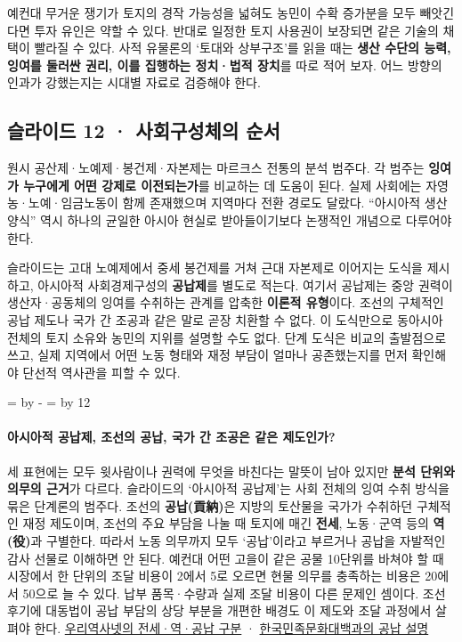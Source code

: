 \documentclass[10pt,a4paper]{article}
\newcommand{\ReserveQuestionSpace}{%
  \par\begingroup
  \dimen0=\pagegoal \advance\dimen0 by -\pagetotal
  \dimen2=\baselineskip \multiply\dimen2 by 12
  \ifdim\dimen0<\dimen2 \newpage\fi
  \endgroup}
\begin{document}
예컨대 무거운 쟁기가 토지의 경작 가능성을 넓혀도 농민이 수확 증가분을 모두 빼앗긴다면 투자 유인은 약할 수 있다. 반대로 일정한 토지 사용권이 보장되면 같은 기술의 채택이 빨라질 수 있다. 사적 유물론의 ‘토대와 상부구조’를 읽을 때는 \textbf{생산 수단의 능력, 잉여를 둘러싼 권리, 이를 집행하는 정치·법적 장치}를 따로 적어 보자. 어느 방향의 인과가 강했는지는 시대별 자료로 검증해야 한다.\par

\subsection{슬라이드 12 · 사회구성체의 순서}
원시 공산제·노예제·봉건제·자본제는 마르크스 전통의 분석 범주다. 각 범주는 \textbf{잉여가 누구에게 어떤 강제로 이전되는가}를 비교하는 데 도움이 된다. 실제 사회에는 자영농·노예·임금노동이 함께 존재했으며 지역마다 전환 경로도 달랐다. “아시아적 생산양식” 역시 하나의 균일한 아시아 현실로 받아들이기보다 논쟁적인 개념으로 다루어야 한다.\par

슬라이드는 고대 노예제에서 중세 봉건제를 거쳐 근대 자본제로 이어지는 도식을 제시하고, 아시아적 사회경제구성의 \textbf{공납제}를 별도로 적는다. 여기서 공납제는 중앙 권력이 생산자·공동체의 잉여를 수취하는 관계를 압축한 \textbf{이론적 유형}이다. 조선의 구체적인 공납 제도나 국가 간 조공과 같은 말로 곧장 치환할 수 없다. 이 도식만으로 동아시아 전체의 토지 소유와 농민의 지위를 설명할 수도 없다. 단계 도식은 비교의 출발점으로 쓰고, 실제 지역에서 어떤 노동 형태와 재정 부담이 얼마나 공존했는지를 먼저 확인해야 단선적 역사관을 피할 수 있다.\par

\ReserveQuestionSpace
\paragraph{아시아적 공납제, 조선의 공납, 국가 간 조공은 같은 제도인가?}
세 표현에는 모두 윗사람이나 권력에 무엇을 바친다는 말뜻이 남아 있지만 \textbf{분석 단위와 의무의 근거}가 다르다. 슬라이드의 ‘아시아적 공납제’는 사회 전체의 잉여 수취 방식을 묶은 단계론의 범주다. 조선의 \textbf{공납(貢納)}은 지방의 토산물을 국가가 수취하던 구체적인 재정 제도이며, 조선의 주요 부담을 나눌 때 토지에 매긴 \textbf{전세}, 노동·군역 등의 \textbf{역(役)}과 구별한다. 따라서 노동 의무까지 모두 ‘공납’이라고 부르거나 공납을 자발적인 감사 선물로 이해하면 안 된다. 예컨대 어떤 고을이 같은 공물 10단위를 바쳐야 할 때 시장에서 한 단위의 조달 비용이 2에서 5로 오르면 현물 의무를 충족하는 비용은 20에서 50으로 늘 수 있다. 납부 품목·수량과 실제 조달 비용이 다른 문제인 셈이다. 조선 후기에 대동법이 공납 부담의 상당 부분을 개편한 배경도 이 제도와 조달 과정에서 살펴야 한다. \href{https://contents.history.go.kr/front/tg/view.do?levelId=tg\_003\_0060\&treeId=0100}{우리역사넷의 전세·역·공납 구분} · \href{https://encykorea.aks.ac.kr/Article/E0004251}{한국민족문화대백과의 공납 설명}\par
\end{document}
